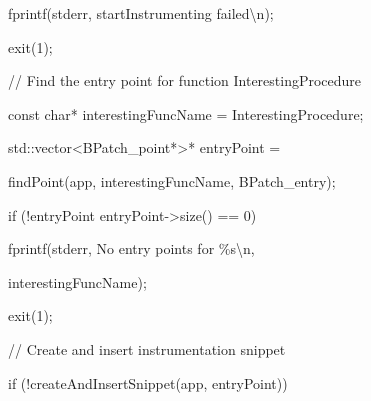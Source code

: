 {{{{{{{{{{{

fprintf(stderr, {\textquotedbl}startInstrumenting failed{\textbackslash}n{\textquotedbl});}



{

exit(1);}



{

}}





\bigskip



{

// Find the entry point for function InterestingProcedure}



{

const char* interestingFuncName = {\textquotedbl}InterestingProcedure{\textquotedbl};}



{

std::vector<BPatch_point*>* entryPoint =



{

findPoint(app, interestingFuncName, BPatch_entry);}



{

if (!entryPoint {\textbar}{\textbar} entryPoint->size() == 0) {}



{

fprintf(stderr, {\textquotedbl}No entry points for \%s{\textbackslash}n{\textquotedbl},

interestingFuncName);}



{

exit(1);}



{

}}





\bigskip



{

// Create and insert instrumentation snippet}



{

if (!createAndInsertSnippet(app, entryPoint)) {}



{

}}}}}}}}}}}}
